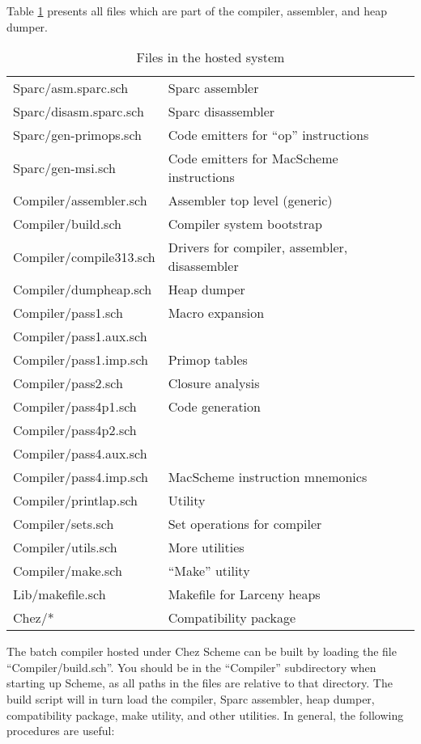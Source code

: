 Table \ref{files} presents all files which are part of the compiler,
assembler, and heap dumper.

\begin{table}[hbt]
\begin{center}
\begin{tabular}{|l|l|} \hline
Sparc/asm.sparc.sch       & Sparc assembler \\
Sparc/disasm.sparc.sch    & Sparc disassembler \\
Sparc/gen-primops.sch     & Code emitters for ``op'' instructions \\
Sparc/gen-msi.sch         & Code emitters for MacScheme instructions \\
Compiler/assembler.sch    & Assembler top level (generic) \\
Compiler/build.sch        & Compiler system bootstrap \\
Compiler/compile313.sch   & Drivers for compiler, assembler, disassembler \\
Compiler/dumpheap.sch     & Heap dumper \\
Compiler/pass1.sch        & Macro expansion \\
Compiler/pass1.aux.sch    & \\
Compiler/pass1.imp.sch    & Primop tables \\
Compiler/pass2.sch        & Closure analysis \\
Compiler/pass4p1.sch      & Code generation \\
Compiler/pass4p2.sch      & \\
Compiler/pass4.aux.sch    & \\
Compiler/pass4.imp.sch    & MacScheme instruction mnemonics \\
Compiler/printlap.sch     & Utility \\
Compiler/sets.sch         & Set operations for compiler \\
Compiler/utils.sch        & More utilities \\
Compiler/make.sch         & ``Make'' utility \\
Lib/makefile.sch          & Makefile for Larceny heaps \\
Chez/*                    & Compatibility package \\ \hline
\end{tabular}
\end{center}
\caption{Files in the hosted system}
\label{files}
\end{table}

The batch compiler hosted under Chez Scheme can be built by loading
the file ``Compiler/build.sch''. You should be in the ``Compiler''
subdirectory when starting up Scheme, as all paths in the files are
relative to that directory. The build script will in turn load the
compiler, Sparc assembler, heap dumper, compatibility package, make
utility, and other utilities. In general, the following procedures are
useful:

